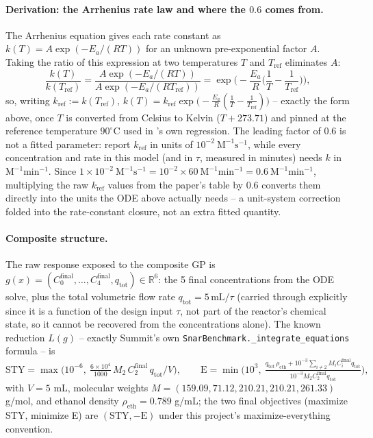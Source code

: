 \documentclass[11pt]{article}
\begin{document}
\paragraph{Derivation: the Arrhenius rate law and where the $0.6$
comes from.} The Arrhenius equation gives each rate constant as
$k(T) = A\exp(-E_a/(RT))$ for an unknown pre-exponential factor $A$.
Taking the ratio of this expression at two temperatures $T$ and
$T_{\mathrm{ref}}$ eliminates $A$:
\[
\frac{k(T)}{k(T_{\mathrm{ref}})}
= \frac{A\exp(-E_a/(RT))}{A\exp(-E_a/(RT_{\mathrm{ref}}))}
= \exp\!\Big(-\frac{E_a}{R}\Big(\frac{1}{T} - \frac{1}{T_{\mathrm{ref}}}\Big)\Big),
\]
so, writing $k_{\mathrm{ref}} := k(T_{\mathrm{ref}})$, $k(T) =
k_{\mathrm{ref}}\exp\!\big(-\tfrac{E_a}{R}(\tfrac1T - \tfrac1{T_{\mathrm{ref}}})\big)$
-- exactly the form above, once $T$ is converted from Celsius to
Kelvin ($T + 273.71$) and pinned at the reference temperature
$90^\circ$C used in \citet{hone2017snar}'s own regression. The
leading factor of $0.6$ is not a fitted parameter: \citet{hone2017snar}
report $k_{\mathrm{ref}}$ in units of $10^{-2}\ \mathrm{M^{-1}s^{-1}}$,
while every concentration and rate in this model (and in $\tau$,
measured in minutes) needs $k$ in $\mathrm{M^{-1}min^{-1}}$. Since
$1 \times 10^{-2}\ \mathrm{M^{-1}s^{-1}} = 10^{-2} \times 60\
\mathrm{M^{-1}min^{-1}} = 0.6\ \mathrm{M^{-1}min^{-1}}$, multiplying
the raw $k_{\mathrm{ref}}$ values from the paper's table by $0.6$
converts them directly into the units the ODE above actually needs --
a unit-system correction folded into the rate-constant closure, not an
extra fitted quantity.

\paragraph{Composite structure.} The raw response exposed to the
composite GP is $g(x) = (C_0^{\mathrm{final}}, \ldots, C_4^{\mathrm{final}},
q_{\mathrm{tot}}) \in \mathbb{R}^6$: the 5 final concentrations from
the ODE solve, plus the total volumetric flow rate
$q_{\mathrm{tot}} = 5\,\mathrm{mL}/\tau$ (carried through explicitly
since it is a function of the design input $\tau$, not part of the
reactor's chemical state, so it cannot be recovered from the
concentrations alone). The known reduction $L(g)$ -- exactly Summit's
own \texttt{SnarBenchmark.\_integrate\_equations} formula -- is
\[
\mathrm{STY} = \max\!\Big(10^{-6},\ \tfrac{6\times10^4}{1000}\, M_2\, C_2^{\mathrm{final}}\, q_{\mathrm{tot}} / V\Big), \qquad
\mathrm{E} = \min\!\Big(10^3,\ \tfrac{q_{\mathrm{tot}}\,\rho_{\mathrm{eth}} + 10^{-3}\!\sum_{i\neq 2} M_i C_i^{\mathrm{final}} q_{\mathrm{tot}}}{10^{-3} M_2 C_2^{\mathrm{final}} q_{\mathrm{tot}}}\Big),
\]
with $V = 5$ mL, molecular weights
$M = (159.09, 71.12, 210.21, 210.21, 261.33)$ g/mol, and ethanol
density $\rho_{\mathrm{eth}} = 0.789$ g/mL; the two final objectives
(maximize STY, minimize E) are $(\mathrm{STY}, -\mathrm{E})$ under this
project's maximize-everything convention.
\end{document}
